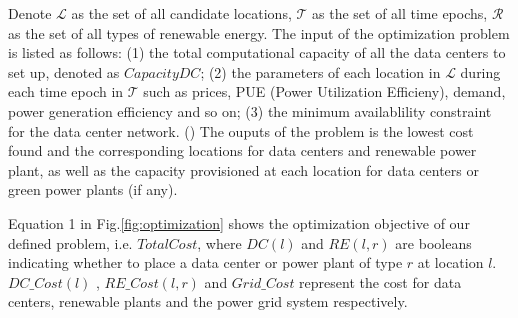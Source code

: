Denote $\mathcal{L}$ as the set of all candidate locations, $\mathcal{T}$ as the set of all time epochs, $\mathcal{R}$ as the set of all types of renewable energy. The input of the optimization problem is listed as follows:
(1) the total computational capacity of all the data centers to set up, denoted as $CapacityDC$;
(2) the parameters of each location in $\mathcal{L}$ during each time epoch in $\mathcal{T}$ such as prices, PUE (Power Utilization Efficieny), demand, power generation efficiency and so on;
(3) the minimum availablility constraint for the data center network. ()
The ouputs of the problem is the lowest cost found and the corresponding locations for data centers and renewable power plant, as well as the capacity provisioned at each location for data centers or green power plants (if any).

Equation 1 in Fig.\ref{fig:optimization} shows the optimization objective of our defined problem, i.e. $TotalCost$, where $DC(l)$ and $RE(l,r)$ are booleans indicating whether to place a data center or power plant of type $r$ at location $l$. $DC\_Cost(l)$ , $RE\_Cost(l,r)$ and $Grid\_Cost$ represent the cost for data centers, renewable plants and the power grid system respectively.

